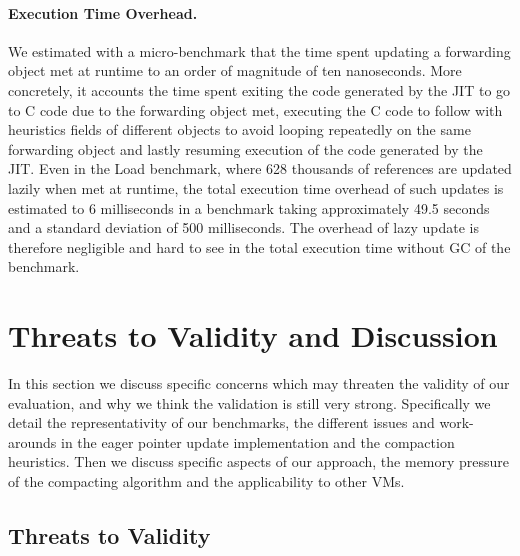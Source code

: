 \documentclass[sigplan,10pt,review,anonymous]{acmart}\settopmatter{printfolios=true,printccs=false,printacmref=false}
\begin{document}
\paragraph{Execution Time Overhead.} We estimated with a micro-benchmark that the time spent updating a forwarding object met at runtime to an order of magnitude of ten nanoseconds. More concretely, it  accounts the time spent exiting the code generated by the JIT to go to C code due to the forwarding object met, executing the C code to follow with heuristics fields of different objects to avoid looping repeatedly on the same forwarding object and lastly resuming execution of the code generated by the JIT. Even in the Load benchmark, where 628 thousands of references are updated lazily when met at runtime, the total execution time overhead of such updates is estimated to 6 milliseconds in a benchmark taking approximately 49.5 seconds and a standard deviation of 500 milliseconds. The overhead of lazy update is therefore negligible and hard to see in the total execution time without GC of the benchmark.


\section{Threats to Validity and Discussion}
\label{sec:threats}

In this section we discuss specific concerns which may threaten the validity of our evaluation, and why we think the validation is still very strong. Specifically we detail the representativity of our benchmarks, the different issues and work-arounds in the eager pointer update implementation and the compaction heuristics. 
Then we discuss specific aspects of our approach, the memory pressure of the compacting algorithm and the applicability to other VMs.

\subsection{Threats to Validity}
\end{document}
